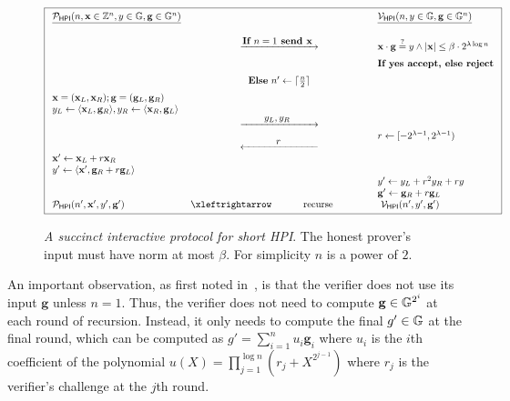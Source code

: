 \begin{figure}[h]
  \centering
  \caption{\emph{A succinct interactive protocol for short HPI}. %
  The honest prover's input must have norm at most $\beta$. For simplicity $n$ is a power of $2$.} 
  \label{fig:HPI}
  \vspace{-2mm}
  \[\boxed
  {\begin{array}{lcl}
  \underline{\prover_\textsf{HPI}(n, \x \in \Z^n, y \in \G, \mathbf{g} \in \G^{n})} && 
    \underline{\verifier_\textsf{HPI}(n, y \in \G, \mathbf{g} \in \G^{n})}\\[5mm]
    & \FlowRight{\textbf{If $n= 1$ \text{send} $\x$}} &  \x \cdot \g  \stackrel{?}{=} y  \wedge |\mathbf{x}| \leq \beta \cdot 2^{\lambda \log n} \\ [2mm]
    && \textbf{If yes accept, else reject} \\[2mm]
     
    & \textbf{Else} \ n' \leftarrow \lceil \frac{n}{2} \rceil & \\[2mm]
     \x = (\x_L, \x_R); \g = (\g_L, \g_R) &&\\
   y_L \gets \langle \x_L, \g_R \rangle, y_R \gets \langle \x_R,\g_L \rangle && \\ 
    & \FlowRight{y_L, y_R} & \\ 
    & \FlowLeft{r} & \raisebox{4mm}{$r \gets [-2^{\lambda-1},2^{\lambda-1})$} \\
    \x' \gets \x_L + r \x_R  && \\
    y' \gets  \langle \x', \g_R + r \g_L \rangle && \\
    
    &&  y' \leftarrow y_L + r^2 y_R + r y \\ 
   && \g' \leftarrow  \g_R + r \g_L  \\ 
   
   \prover_\textsf{HPI}(n',\x', y', \g') & \FlowLeftRight{\text{recurse}}  & \ \verifier_\textsf{HPI}(n', y', \g')  \\

          \end{array}}\]
  \end{figure}

An important observation, as first noted in~\cite{Halo}, is that the verifier does not use its input $\mathbf{g}$ unless $n = 1$. Thus, the verifier does not need to compute $\mathbf{g} \in \mathbb{G}^{2^i}$ at each round of recursion. Instead, it only needs to compute the final $g' \in \mathbb{G}$ at the final round, which can be computed as $g' = \sum_{i = 1}^n u_i \mathbf{g}_i$ where $u_i$ is the $i$th coefficient of the polynomial $u(X) = \prod_{j = 1}^{\log n} (r_j + X^{2^{j-1}})$ where $r_j$ is the verifier's challenge at the $j$th round. 

